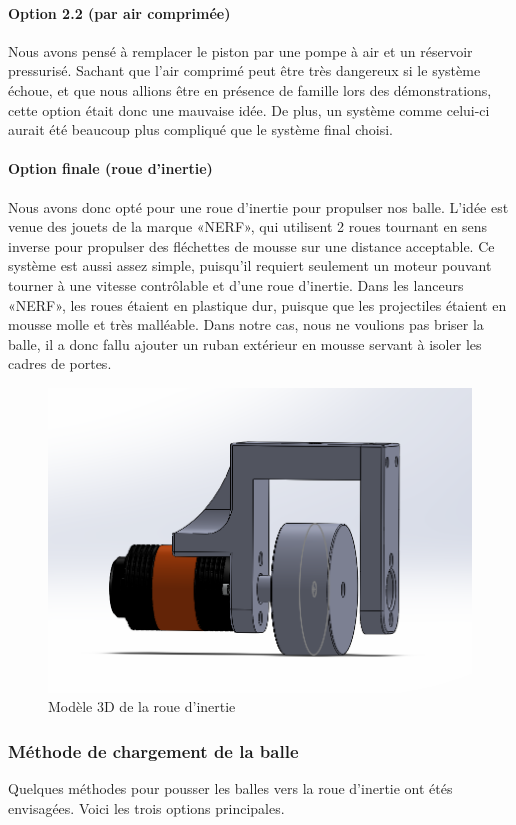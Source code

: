 \paragraph{Option 2.2 (par air comprimée)}
Nous avons pensé à remplacer le piston par une pompe à air et un réservoir pressurisé.
Sachant que l’air comprimé peut être très dangereux si le système échoue, et que nous allions être en présence de famille lors des démonstrations, cette option était donc une mauvaise idée.
De plus, un système comme celui-ci aurait été beaucoup plus compliqué que le système final choisi.

\paragraph{Option finale (roue d’inertie)}
Nous avons donc opté pour une roue d’inertie pour propulser nos balle.
L’idée est venue des jouets de la marque «NERF», qui utilisent 2 roues tournant en sens inverse pour propulser des fléchettes de mousse sur une distance acceptable.
Ce système est aussi assez simple, puisqu’il requiert seulement un moteur pouvant tourner à une vitesse contrôlable et d’une roue d’inertie.
Dans les lanceurs «NERF», les roues étaient en plastique dur, puisque que les projectiles étaient en mousse molle et très malléable.
Dans notre cas, nous ne voulions pas briser la balle, il a donc fallu ajouter un ruban extérieur en mousse servant à isoler les cadres de portes.

\begin{figure}[h!]
    \centering
    \includegraphics[width=0.4\linewidth]{img/s2/cad/flywheel}
    \caption{Modèle 3D de la roue d'inertie}
    \label{fig:s2-cad-flywheel}
\end{figure}

\subsubsection{Méthode de chargement de la balle}
Quelques méthodes pour pousser les balles vers la roue d’inertie ont étés envisagées.
Voici les trois options principales.

